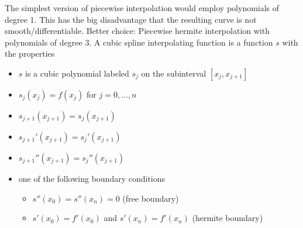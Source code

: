 The simplest version of piecewise interpolation would employ polynomials of degree 1.
This has the big disadvantage that the resulting curve is not smooth/differentiable.
Better choice: Piecewise hermite interpolation with polynomials of degree 3.
A cubic spline interpolating function is a function $s$ with the properties
\begin{itemize}
    \item $s$ is a cubic polynomial labeled $s_j$ on the subinterval $[x_j, x_{j+1}]$
    \item $s_j(x_j) = f(x_j)$ for $j = 0, \ldots, n$
    \item $s_{j+1}(x_{j+1}) =s_j(x_{j+1})$
    \item $s_{j+1}'(x_{j+1}) =s_j'(x_{j+1})$
    \item $s_{j+1}''(x_{j+1}) =s_j''(x_{j+1})$
    \item one of the following boundary conditions
    \begin{itemize}
        \item $s''(x_0)=s''(x_n) = 0$ (free boundary)
        \item $s'(x_0) = f'(x_0)$ and $s'(x_n) = f'(x_n)$ (hermite boundary)
    \end{itemize}
\end{itemize}


